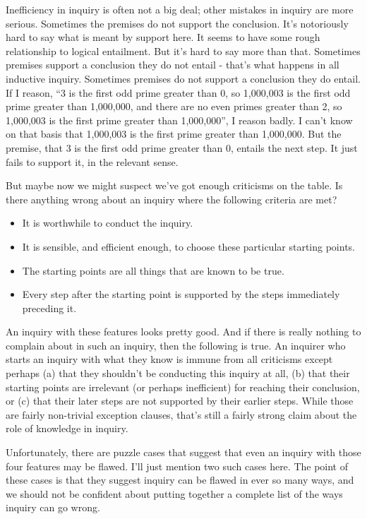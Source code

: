 \documentclass[
  11pt,
]{book}
\providecommand{\tightlist}{%
  \setlength{\itemsep}{0pt}\setlength{\parskip}{0pt}}
\begin{document}
Inefficiency in inquiry is often not a big deal; other mistakes in inquiry are more serious. Sometimes the premises do not support the conclusion. It's notoriously hard to say what is meant by support here. It seems to have some rough relationship to logical entailment. But it's hard to say more than that. Sometimes premises support a conclusion they do not entail - that's what happens in all inductive inquiry. Sometimes premises do not support a conclusion they do entail. If I reason, ``3 is the first odd prime greater than 0, so 1,000,003 is the first odd prime greater than 1,000,000, and there are no even primes greater than 2, so 1,000,003 is the first prime greater than 1,000,000'', I reason badly. I can't know on that basis that 1,000,003 is the first prime greater than 1,000,000. But the premise, that 3 is the first odd prime greater than 0, entails the next step. It just fails to support it, in the relevant sense.

But maybe now we might suspect we've got enough criticisms on the table. Is there anything wrong about an inquiry where the following criteria are met?

\begin{itemize}
\tightlist
\item
  It is worthwhile to conduct the inquiry.
\item
  It is sensible, and efficient enough, to choose these particular starting points.
\item
  The starting points are all things that are known to be true.
\item
  Every step after the starting point is supported by the steps immediately preceding it.
\end{itemize}

An inquiry with these features looks pretty good. And if there is really nothing to complain about in such an inquiry, then the following is true. An inquirer who starts an inquiry with what they know is immune from all criticisms except perhaps (a) that they shouldn't be conducting this inquiry at all, (b) that their starting points are irrelevant (or perhaps inefficient) for reaching their conclusion, or (c) that their later steps are not supported by their earlier steps. While those are fairly non-trivial exception clauses, that's still a fairly strong claim about the role of knowledge in inquiry.

Unfortunately, there are puzzle cases that suggest that even an inquiry with those four features may be flawed. I'll just mention two such cases here. The point of these cases is that they suggest inquiry can be flawed in ever so many ways, and we should not be confident about putting together a complete list of the ways inquiry can go wrong.
\end{document}
